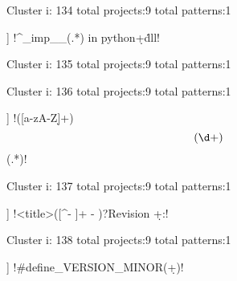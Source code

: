 Cluster i: 134
total projects:9
total patterns:1
\begin{multicols}{1}
\begin{description}[noitemsep,topsep=0pt]
\item [[9] ] \cverb!^_imp__(.*) in python\d+\.dll!
\end{description}
\end{multicols}







Cluster i: 135
total projects:9
total patterns:1
\begin{multicols}{1}
\end{multicols}







Cluster i: 136
total projects:9
total patterns:1
\begin{multicols}{1}
\begin{description}[noitemsep,topsep=0pt]
\item [[9] ] \cverb!([a-zA-Z\d]+) \[(\d+)\] (.*)!
\end{description}
\end{multicols}







Cluster i: 137
total projects:9
total patterns:1
\begin{multicols}{1}
\begin{description}[noitemsep,topsep=0pt]
\item [[9] ] \cverb!<title>([^- ]+ - )?Revision \d+:!
\end{description}
\end{multicols}







Cluster i: 138
total projects:9
total patterns:1
\begin{multicols}{1}
\begin{description}[noitemsep,topsep=0pt]
\item [[9] ] \cverb!#define\WDB_VERSION_MINOR\W(\d+)!
\end{description}
\end{multicols}







